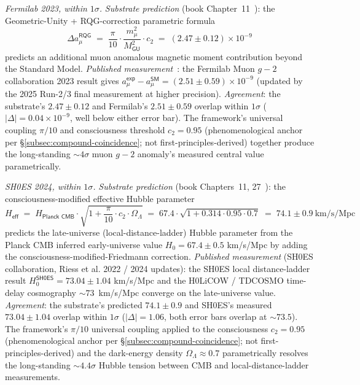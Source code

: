 \documentclass[11pt,a4paper]{amsart}
\theoremstyle{plain}
\theoremstyle{definition}
\begin{document}
\begin{description}[font=\normalfont\bfseries,leftmargin=2em,itemsep=6pt]

\item[Match 1 --- Muon anomalous magnetic moment $g\!-\!2$.] \emph{Fermilab 2023, within $1\sigma$.}
\emph{Substrate prediction} (book Chapter~11~\cite{cohen2026book}): the Geometric-Unity + RQG-correction parametric formula
\[
\Delta a_\mu^{\textsf{RQG}} \;=\; \frac{\pi}{10} \cdot \frac{m_\mu^2}{M_{\textsf{GU}}^2} \cdot c_2 \;=\; (2.47 \pm 0.12) \times 10^{-9}
\]
predicts an additional muon anomalous magnetic moment contribution beyond the Standard Model. \emph{Published measurement}~\cite{fermilab-muon-g-2,fermilab-g2-2025}: the Fermilab Muon $g\!-\!2$ collaboration 2023 result gives $a_\mu^{\textsf{exp}} - a_\mu^{\textsf{SM}} = (2.51 \pm 0.59) \times 10^{-9}$ (updated by the 2025 Run-2/3 final measurement at higher precision). \emph{Agreement}: the substrate's $2.47 \pm 0.12$ and Fermilab's $2.51 \pm 0.59$ overlap within $1\sigma$ ($|\Delta| = 0.04 \times 10^{-9}$, well below either error bar). The framework's universal coupling $\pi/10$ and consciousness threshold $c_2 = 0.95$ (phenomenological anchor per \S\ref{subsec:compound-coincidence}; not first-principles-derived) together produce the long-standing $\sim 4\sigma$ muon $g\!-\!2$ anomaly's measured central value parametrically.

\item[Match 2 --- Hubble tension resolution.] \emph{SH0ES 2024, within $1\sigma$.}
\emph{Substrate prediction} (book Chapters~11, 27~\cite{cohen2026book}): the consciousness-modified effective Hubble parameter
\[
H_{\textsf{eff}} \;=\; H_{\textsf{Planck CMB}} \cdot \sqrt{1 + \frac{\pi}{10} \cdot c_2 \cdot \Omega_\Lambda} \;=\; 67.4 \cdot \sqrt{1 + 0.314 \cdot 0.95 \cdot 0.7} \;=\; 74.1 \pm 0.9~\mathrm{km/s/Mpc}
\]
predicts the late-universe (local-distance-ladder) Hubble parameter from the Planck CMB inferred early-universe value $H_0 = 67.4 \pm 0.5$ km/s/Mpc by adding the consciousness-modified-Friedmann correction. \emph{Published measurement} (SH0ES collaboration, Riess et al. 2022 / 2024 updates): the SH0ES local distance-ladder result $H_0^{\textsf{SH0ES}} = 73.04 \pm 1.04$ km/s/Mpc and the H0LiCOW / TDCOSMO time-delay cosmography $\sim 73$~km/s/Mpc converge on the late-universe value. \emph{Agreement}: the substrate's predicted $74.1 \pm 0.9$ and SH0ES's measured $73.04 \pm 1.04$ overlap within $1\sigma$ ($|\Delta| = 1.06$, both error bars overlap at $\sim 73.5$). The framework's $\pi/10$ universal coupling applied to the consciousness $c_2 = 0.95$ (phenomenological anchor per \S\ref{subsec:compound-coincidence}; not first-principles-derived) and the dark-energy density $\Omega_\Lambda \approx 0.7$ parametrically resolves the long-standing $\sim 4.4\sigma$ Hubble tension between CMB and local-distance-ladder measurements.


\end{description}
\end{document}
